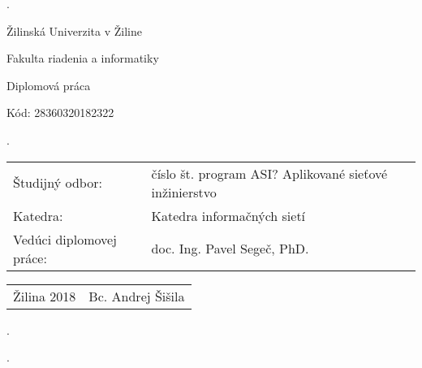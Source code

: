 \begin{titlepage}

\phantom.

\bigskip

\begin{center}
{\sc\LARGE Žilinská Univerzita v Žiline}

\medskip

{\sc\Large Fakulta riadenia a informatiky}

\vspace{4cm}

{\sc\LARGE Diplomová práca}

\medskip

{\large\bf \nazovpraceSK}

\bigskip

Kód: 28360320182322

\end{center}

\phantom.\hfill
\begin{center}


\begin{tabu} to 1.0 \textwidth { X[4,l] X[8,r] }
 Študijný odbor: & číslo št. program ASI? Aplikované sieťové inžinierstvo \\ 
 Katedra: & Katedra informačných sietí \\
 Vedúci diplomovej práce: & doc. Ing. Pavel Segeč, PhD. \\
\end{tabu}

\vspace*{\fill}

\begin{tabu} to 1.0 \textwidth { X[l] X[r] }
 Žilina 2018  & Bc. Andrej Šišila  \\
\end{tabu}

\end{center}
\hspace{1.7cm}\phantom.

\vspace{2.9cm}

\phantom.
\end{titlepage}